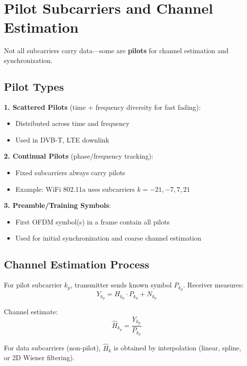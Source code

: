 \section{Pilot Subcarriers and Channel Estimation}

Not all subcarriers carry data---some are \textbf{pilots} for channel estimation and synchronization.

\subsection{Pilot Types}

\textbf{1. Scattered Pilots} (time + frequency diversity for fast fading):
\begin{itemize}
\item Distributed across time and frequency
\item Used in DVB-T, LTE downlink
\end{itemize}

\textbf{2. Continual Pilots} (phase/frequency tracking):
\begin{itemize}
\item Fixed subcarriers always carry pilots
\item Example: WiFi 802.11a uses subcarriers $k = -21, -7, 7, 21$
\end{itemize}

\textbf{3. Preamble/Training Symbols}:
\begin{itemize}
\item First OFDM symbol(s) in a frame contain all pilots
\item Used for initial synchronization and coarse channel estimation
\end{itemize}

\subsection{Channel Estimation Process}

For pilot subcarrier $k_p$, transmitter sends known symbol $P_{k_p}$. Receiver measures:
\begin{equation}
Y_{k_p} = H_{k_p} \cdot P_{k_p} + N_{k_p}
\end{equation}

Channel estimate:
\begin{equation}
\hat{H}_{k_p} = \frac{Y_{k_p}}{P_{k_p}}
\end{equation}

For data subcarriers (non-pilot), $\hat{H}_k$ is obtained by interpolation (linear, spline, or 2D Wiener filtering).

